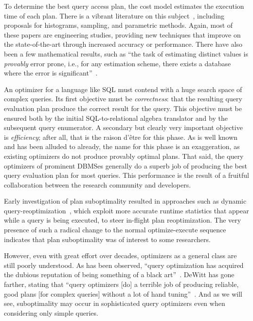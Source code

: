 \documentclass[prodmode,acmtods]{acmsmall}
\begin{document}
To determine the best query access plan, the cost model estimates the
execution time of each plan. There is a vibrant literature on this
\hbox{subject~\cite{Ioannidis03,Mannino88}}, including proposals for
histograms, sampling, and parametric methods. Again, most of these papers
are engineering studies, providing new techniques that improve on the
state-of-the-art through increased accuracy or performance. There have also
been a few mathematical results, such as ``the task of estimating distinct
values is {\em provably} error prone, i.e., for any estimation scheme, there
exists a database where the error is significant''~\cite{Chaudhuri98}.

An optimizer for a language like SQL must contend with a huge search space of
complex queries. Its first objective must be {\em correctness}: that the
resulting query evaluation plan produce the correct result for the
query. This objective must be ensured both by the initial SQL-to-relational
algebra translator and by the subsequent query enumerator. A secondary but clearly very important objective is {\em efficiency}; after
all, that is the raison d'\^etre for this phase. As is well known and has been
alluded to already, the name
for this phase is an exaggeration, as existing optimizers do not produce
provably optimal plans. That said, the
query optimizers of prominent \hbox{DBMSes} generally do a superb job of producing
the best query evaluation plan for most queries. This performance is the
result of a fruitful collaboration between the research community and
developers.

Early investigation of plan suboptimality resulted in approaches such as
dynamic query-reoptimization~\cite{Avnur,Bellamkonda13,kabra98,Li07}, which exploit more
accurate runtime statistics that appear while a query is being executed, to
steer in-flight plan reoptimization. The very presence of such a radical
change to the normal optimize-execute sequence indicates that plan
suboptimality was of interest to some researchers.

However, even with great effort over decades, optimizers as a general class
are still poorly understood. As has been observed, ``query optimization has
acquired the dubious reputation of being something of a black
art''~\cite{Babcock05}. DeWitt has gone farther, stating that ``query
optimizers [do] a terrible job of producing reliable, good plans [for
  complex queries] without a lot of hand
tuning''~\cite[page~59]{winslett02}. And as we will see, suboptimality may
occur in sophisticated query optimizers even when considering only simple queries.
\end{document}
